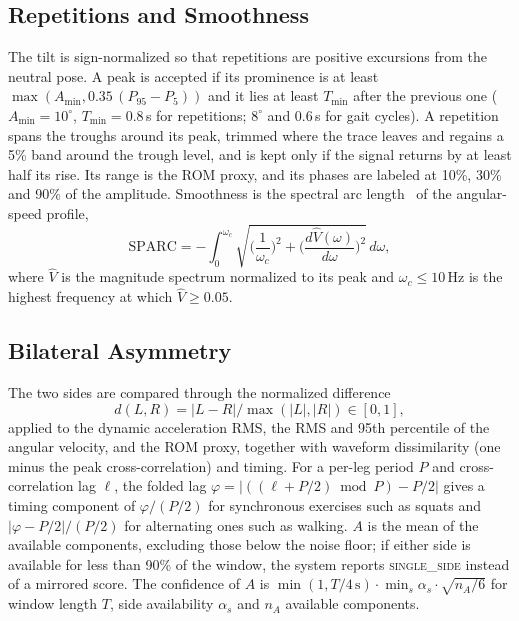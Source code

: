 \documentclass[conference]{IEEEtran}
\begin{document}
\subsection{Repetitions and Smoothness}
The tilt is sign-normalized so that repetitions are positive excursions from the neutral pose. A peak is accepted if its prominence is at least $\max(A_{\min},0.35\,(P_{95}-P_{5}))$ and it lies at least $T_{\min}$ after the previous one ($A_{\min}=10^\circ$, $T_{\min}=0.8$\,s for repetitions; $8^\circ$ and 0.6\,s for gait cycles). A repetition spans the troughs around its peak, trimmed where the trace leaves and regains a 5\% band around the trough level, and is kept only if the signal returns by at least half its rise. Its range is the ROM proxy, and its phases are labeled at 10\%, 30\% and 90\% of the amplitude. Smoothness is the spectral arc length~\cite{balasubramanian2015} of the angular-speed profile,
\begin{equation}
\mathrm{SPARC}=-\int_{0}^{\omega_c}\sqrt{\Big(\frac{1}{\omega_c}\Big)^{2}+\Big(\frac{d\hat V(\omega)}{d\omega}\Big)^{2}}\,d\omega ,
\label{eq:sparc}
\end{equation}
where $\hat V$ is the magnitude spectrum normalized to its peak and $\omega_c\le10$\,Hz is the highest frequency at which $\hat V\ge0.05$.

\subsection{Bilateral Asymmetry}
The two sides are compared through the normalized difference
\begin{equation}
d(L,R)=\lvert L-R\rvert/\max(\lvert L\rvert,\lvert R\rvert)\in[0,1],
\label{eq:nd}
\end{equation}
applied to the dynamic acceleration RMS, the RMS and 95th percentile of the angular velocity, and the ROM proxy, together with waveform dissimilarity (one minus the peak cross-correlation) and timing. For a per-leg period $P$ and cross-correlation lag $\ell$, the folded lag $\varphi=\lvert((\ell+P/2)\bmod P)-P/2\rvert$ gives a timing component of $\varphi/(P/2)$ for synchronous exercises such as squats and $\lvert\varphi-P/2\rvert/(P/2)$ for alternating ones such as walking. $A$ is the mean of the available components, excluding those below the noise floor; if either side is available for less than 90\% of the window, the system reports \textsc{single\_side} instead of a mirrored score. The confidence of $A$ is $\min(1,T/4\,\mathrm{s})\cdot\min_s\alpha_s\cdot\sqrt{n_A/6}$ for window length $T$, side availability $\alpha_s$ and $n_A$ available components.
\end{document}
